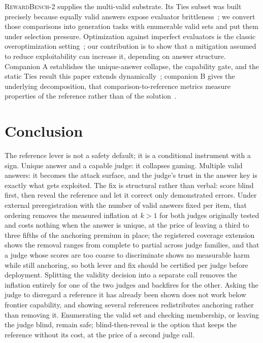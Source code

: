 \documentclass[11pt]{article}
\begin{document}
\textsc{RewardBench-2} supplies the multi-valid substrate.
Its Ties subset was built precisely because equally valid answers expose evaluator brittleness~\cite{malik2025rewardbench2}; we convert those comparisons into generation tasks with enumerable valid sets and put them under selection pressure.
Optimization against imperfect evaluators is the classic overoptimization setting~\cite{gao2022scaling}; our contribution is to show that a mitigation assumed to reduce exploitability can increase it, depending on answer structure.
Companion A establishes the unique-answer collapse, the capability gate, and the static Ties result this paper extends dynamically~\cite{companionA}; companion B gives the underlying decomposition, that comparison-to-reference metrics measure properties of the reference rather than of the solution~\cite{companionB}.

\section{Conclusion}
The reference lever is not a safety default; it is a conditional instrument with a sign.
Unique answer and a capable judge: it collapses gaming.
Multiple valid answers: it becomes the attack surface, and the judge's trust in the answer key is exactly what gets exploited.
The fix is structural rather than verbal: score blind first, then reveal the reference and let it correct only demonstrated errors.
Under external preregistration with the number of valid answers fixed per item, that ordering removes the measured inflation at $k > 1$ for both judges originally tested and costs nothing when the answer is unique, at the price of leaving a third to three fifths of the anchoring premium in place; the registered coverage extension shows the removal ranges from complete to partial across judge families, and that a judge whose scores are too coarse to discriminate shows no measurable harm while still anchoring, so both lever and fix should be certified per judge before deployment.
Splitting the validity decision into a separate call removes the inflation entirely for one of the two judges and backfires for the other.
Asking the judge to disregard a reference it has already been shown does not work below frontier capability, and showing several references redistributes anchoring rather than removing it.
Enumerating the valid set and checking membership, or leaving the judge blind, remain safe; blind-then-reveal is the option that keeps the reference without its cost, at the price of a second judge call.
\end{document}
